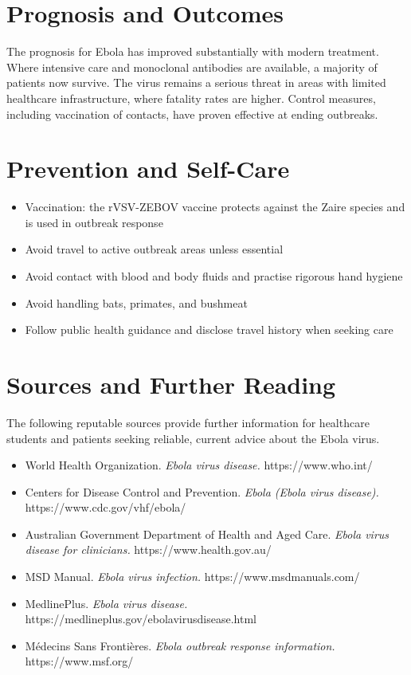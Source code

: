 \section*{Prognosis and Outcomes}
The prognosis for Ebola has improved substantially with modern treatment. Where intensive care and monoclonal antibodies are available, a majority of patients now survive. The virus remains a serious threat in areas with limited healthcare infrastructure, where fatality rates are higher. Control measures, including vaccination of contacts, have proven effective at ending outbreaks.

\section*{Prevention and Self-Care}
\begin{itemize}
    \item Vaccination: the rVSV-ZEBOV vaccine protects against the Zaire species and is used in outbreak response
    \item Avoid travel to active outbreak areas unless essential
    \item Avoid contact with blood and body fluids and practise rigorous hand hygiene
    \item Avoid handling bats, primates, and bushmeat
    \item Follow public health guidance and disclose travel history when seeking care
\end{itemize}

\section*{Sources and Further Reading}
The following reputable sources provide further information for healthcare students and patients seeking reliable, current advice about the Ebola virus.
\begin{itemize}
    \item World Health Organization. \textit{Ebola virus disease.} https://www.who.int/
    \item Centers for Disease Control and Prevention. \textit{Ebola (Ebola virus disease).} https://www.cdc.gov/vhf/ebola/
    \item Australian Government Department of Health and Aged Care. \textit{Ebola virus disease for clinicians.} https://www.health.gov.au/
    \item MSD Manual. \textit{Ebola virus infection.} https://www.msdmanuals.com/
    \item MedlinePlus. \textit{Ebola virus disease.} https://medlineplus.gov/ebolavirusdisease.html
    \item Médecins Sans Frontières. \textit{Ebola outbreak response information.} https://www.msf.org/
\end{itemize}
